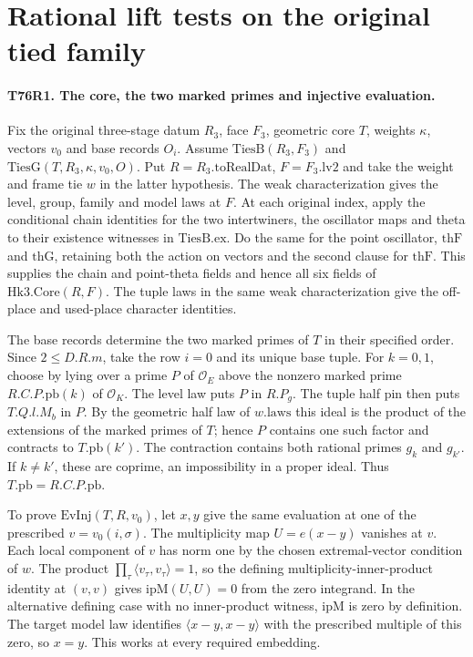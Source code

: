 \section{Rational lift tests on the original tied family}

\paragraph{T76R1. The core, the two marked primes and injective evaluation.}
Fix the original three-stage datum $R_3$, face $F_3$, geometric
core $T$, weights $\kappa$, vectors $v_0$ and base records $O_i$.
Assume $\mathrm{TiesB}(R_3,F_3)$ and
$\mathrm{TiesG}(T,R_3,\kappa,v_0,O)$. Put $R=R_3.\mathrm{toRealDat}$,
$F=F_3.\mathrm{lv2}$ and take the weight and frame tie $w$
in the latter hypothesis. The weak characterization gives the level,
group, family and model laws at $F$. At each original index,
apply the conditional chain identities for the two intertwiners,
the oscillator maps and theta to their existence witnesses in
$\mathrm{TiesB.ex}$. Do the same for the point oscillator,
$\mathrm{thF}$ and $\mathrm{thG}$, retaining both the action on vectors
and the second clause for $\mathrm{thF}$. This supplies the chain
and point-theta fields and hence all six fields of $\mathrm{Hk3.Core}(R,F)$.
The tuple laws in the same weak characterization give the off-place
and used-place character identities.

The base records determine the two marked primes of $T$ in their
specified order. Since $2\le D.R.m$, take the row $i=0$ and its
unique base tuple. For $k=0,1$, choose by lying over a prime $P$ of
$\mathcal O_E$ above the nonzero marked prime $R.C.P.\mathrm{pb}(k)$
of $\mathcal O_K$. The level law puts $P$ in $R.P_g$. The tuple half
pin then puts $T.Q.l.M_b$ in $P$. By the geometric half law of
$w.\mathrm{laws}$ this ideal is the product of the extensions of
the marked primes of $T$; hence $P$ contains one such factor and
contracts to $T.\mathrm{pb}(k')$. The contraction contains both
rational primes $g_k$ and $g_{k'}$. If $k\ne k'$, these are
coprime, an impossibility in a proper ideal. Thus
$T.\mathrm{pb}=R.C.P.\mathrm{pb}$.

To prove $\mathrm{EvInj}(T,R,v_0)$, let $x,y$ give the same
evaluation at one of the prescribed $v=v_0(i,\sigma)$. The
multiplicity map $U=e(x-y)$ vanishes at $v$. Each local component of
$v$ has norm one by the chosen extremal-vector condition of $w$.
The product $\prod_\tau\langle v_\tau,v_\tau\rangle=1$, so the
defining multiplicity-inner-product identity at $(v,v)$ gives
$\mathrm{ipM}(U,U)=0$ from the zero integrand. In the alternative
defining case with no inner-product witness, $\mathrm{ipM}$ is
zero by definition. The target model law identifies
$\langle x-y,x-y\rangle$ with the prescribed multiple of this
zero, so $x=y$. This works at every required embedding.

